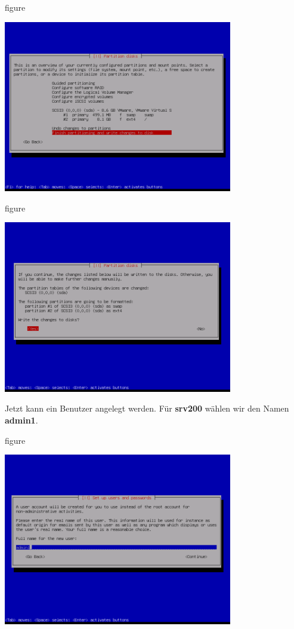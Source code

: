 \begin{nofloat}{figure}
\begin{center}
\includegraphics[width=0.75\textwidth]{screenshots/25_ubuntu_install.png}
\end{center}
\end{nofloat}

\begin{nofloat}{figure}
\begin{center}
\includegraphics[width=0.75\textwidth]{screenshots/26_ubuntu_install.png}
\end{center}
\end{nofloat}
\newpage
Jetzt kann ein Benutzer angelegt werden. Für \textbf{srv200} wählen wir den
Namen \textbf{admin1}.

\begin{nofloat}{figure}
\begin{center}
\includegraphics[width=0.75\textwidth]{screenshots/27_ubuntu_install.png}
\end{center}
\end{nofloat}

